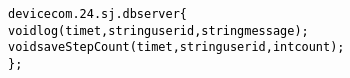 \documentclass{note}
\begin{document}
\begin{alltt}
  \textcolor{black}{device com.24.sj.dbserver \{
    void log(time t, string userid, string message); 
    void saveStepCount(time t, string userid, int count);
  \};}
\end{alltt}


\end{document}
